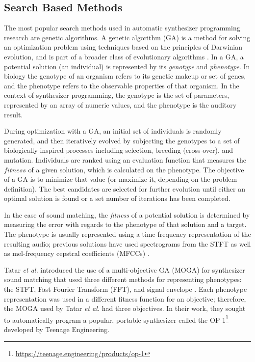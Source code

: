 \subsection{Search Based Methods}
The most popular search methods used in automatic synthesizer programming research are genetic algorithms. A genetic algorithm (GA) is a method for solving an optimization problem using techniques based on the principles of Darwinian evolution, and is part of a broader class of evolutionary algorithms \cite{whitley1994genetic}. In a GA, a potential solution (an individual) is represented by its \textit{genotype} and \textit{phenotype}. In biology the genotype of an organism refers to its genetic makeup or set of genes, and the phenotype refers to the observable properties of that organism. In the context of synthesizer programming, the genotype is the set of parameters, represented by an array of numeric values, and the phenotype is the auditory result. 

During optimization with a GA, an initial set of individuals is randomly generated, and then iteratively evolved by subjecting the genotypes to a set of biologically inspired processes including selection, breeding (cross-over), and mutation. Individuals are ranked using an evaluation function that measures the $fitness$ of a given solution, which is calculated on the phenotype. The objective of a GA is to minimize that value (or maximize it, depending on the problem definition). The best candidates are selected for further evolution until either an optimal solution is found or a set number of iterations has been completed.

In the case of sound matching, the \textit{fitness} of a potential solution is determined by measuring the error with regards to the phenotype of that solution and a target. The phenotype is usually represented using a time-frequency representation of the resulting audio; previous solutions have used spectrograms from the STFT \cite{horner1993machine, tatar2016automatic, masudo2021quality} as well as mel-frequency cepstral coefficients (MFCCs) \cite{yee2008synthbot, roth2011comparison, macret2014automatic, smith2017play}.

Tatar \textit{et al.} introduced the use of a multi-objective GA (MOGA) for synthesizer sound matching that used three different methods for representing phenotypes: the STFT, Fast Fourier Transform (FFT), and signal envelope \cite{tatar2016automatic}. Each phenotype representation was used in a different fitness function for an objective; therefore, the MOGA used by Tatar \textit{et al.} had three objectives. In their work, they sought to automatically program a popular, portable synthesizer called the OP-1\footnote{\url{https://teenage.engineering/products/op-1}} developed by Teenage Engineering.

